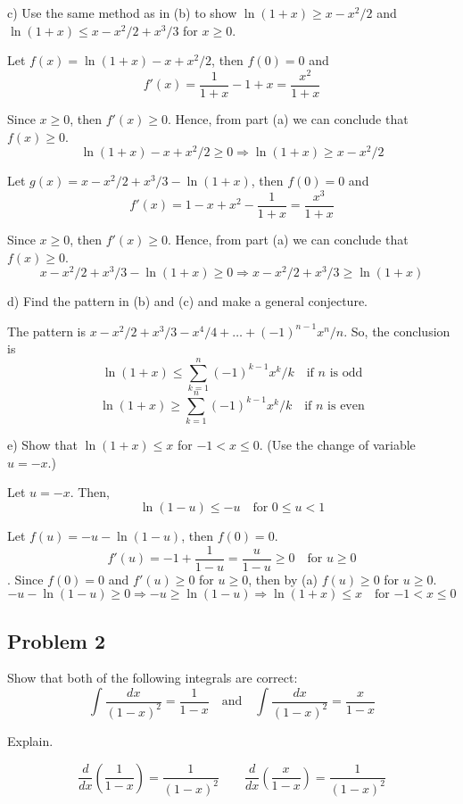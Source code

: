 \documentclass{article}
\begin{document}
\begin{tcolorbox}
    c) Use the same method as in (b) to show $\ln{(1 + x)} \geq x - x^2/2$ and $\ln{(1 + x)} \leq x - x^2/2 + x^3/3$ for $x \geq 0$.
\end{tcolorbox}

Let $f(x) = \ln{(1+x)} - x + x^2/2$, then $f(0) = 0$ and
\[ f'(x) = \frac{1}{1+x} - 1 + x = \frac{x^2}{1+x} \]

\par Since $x \geq 0$, then $f'(x) \geq 0$. Hence, from part (a) we can conclude that $f(x) \geq 0$.
\[ \ln{(1+x)} - x + x^2/2 \geq 0 \Rightarrow \ln{(1+x) \geq x - x^2/2} \]

\par Let $g(x) = x - x^2/2 + x^3/3 - \ln{(1+x)}$, then $f(0) = 0$ and
\[ f'(x) = 1 - x + x^2 - \frac{1}{1+x} = \frac{x^3}{1+x} \]

\par Since $x \geq 0$, then $f'(x) \geq 0$. Hence, from part (a) we can conclude that $f(x) \geq 0$.
\[ x - x^2/2 + x^3/3 - \ln{(1+x)} \geq 0 \Rightarrow x - x^2/2 + x^3/3 \geq \ln{(1+x)}  \]

\begin{tcolorbox}
    d) Find the pattern in (b) and (c) and make a general conjecture.
\end{tcolorbox}
The pattern is $x - x^2/2 + x^3/3 - x^4/4 + \dots + (-1)^{n-1}x^n/n$. So, the conclusion is
\[ \ln{(1+x)} \leq \sum \limits_{k = 1}^{n} (-1)^{k-1}x^k/k \quad \text{if $n$ is odd} \]
\[\ln{(1+x)} \geq \sum \limits_{k = 1}^{n} (-1)^{k-1}x^k/k \quad \text{if $n$ is even} \]

\begin{tcolorbox}
    e) Show that $\ln(1 + x) \leq x$ for $-1 < x \leq 0$. (Use the change of variable $u = -x$.)
\end{tcolorbox}
Let $u = -x$. Then,
\[ \ln{(1-u)} \leq -u \quad \text{for $0 \leq u < 1$} \]
\par Let $f(u) = -u - \ln{(1-u)}$, then $f(0) = 0$.
\[ f'(u) = -1 + \frac{1}{1-u} = \frac{u}{1-u} \geq 0 \quad \text{for $u \geq 0$} \].
Since $f(0) = 0$ and $f'(u) \geq 0$ for $u \geq 0$, then by (a) $f(u) \geq 0$ for $u \geq 0$.
\[ -u - \ln{(1-u)} \geq 0 \Rightarrow -u \geq \ln{(1-u)} \Rightarrow \ln{(1+x)} \leq x \quad \text{for $-1 < x \leq 0$}  \]

\subsection{Problem 2}
\begin{tcolorbox}
    Show that both of the following integrals are correct:
    \[ \int{\frac{dx}{(1-x)^2} = \frac{1}{1-x}} \quad \text{and} \quad \int{\frac{dx}{(1-x)^2} = \frac{x}{1-x}} \]
    \par Explain.
\end{tcolorbox}
\[ \frac{d}{dx}\left(\frac{1}{1-x}\right) = \frac{1}{(1-x)^2} \quad \quad \frac{d}{dx}\left(\frac{x}{1-x}\right) = \frac{1}{(1-x)^2} \]
\end{document}
